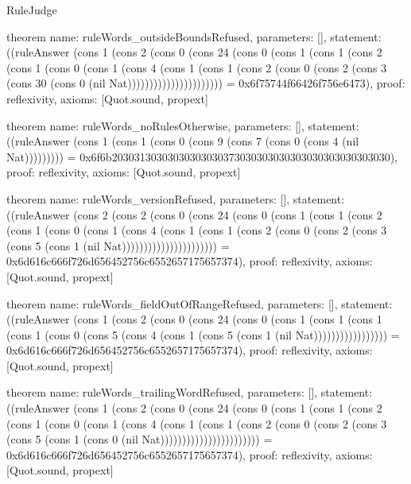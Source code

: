 \begin{lexlean}{RuleJudge}
\begin{semanticmodule}
theorem{
  name: ruleWords_outsideBoundsRefused,
  parameters: [],
  statement: ((ruleAnswer (cons 1 (cons 2 (cons 0 (cons 24 (cons 0 (cons 1 (cons 1 (cons 2 (cons 1 (cons 0 (cons 1 (cons 4 (cons 1 (cons 1 (cons 2 (cons 0 (cons 2 (cons 3 (cons 30 (cons 0 (nil Nat)))))))))))))))))))))) = 0x6f75744f66426f756e6473),
  proof: reflexivity{},
  axioms: [Quot.sound, propext]
}

theorem{
  name: ruleWords_noRulesOtherwise,
  parameters: [],
  statement: ((ruleAnswer (cons 1 (cons 1 (cons 0 (cons 9 (cons 7 (cons 0 (cons 4 (nil Nat))))))))) = 0x6f6b20303130303030303030373030303030303030303030303030),
  proof: reflexivity{},
  axioms: [Quot.sound, propext]
}

theorem{
  name: ruleWords_versionRefused,
  parameters: [],
  statement: ((ruleAnswer (cons 2 (cons 2 (cons 0 (cons 24 (cons 0 (cons 1 (cons 1 (cons 2 (cons 1 (cons 0 (cons 1 (cons 4 (cons 1 (cons 1 (cons 2 (cons 0 (cons 2 (cons 3 (cons 5 (cons 1 (nil Nat)))))))))))))))))))))) = 0x6d616c666f726d656452756c6552657175657374),
  proof: reflexivity{},
  axioms: [Quot.sound, propext]
}

theorem{
  name: ruleWords_fieldOutOfRangeRefused,
  parameters: [],
  statement: ((ruleAnswer (cons 1 (cons 2 (cons 0 (cons 24 (cons 0 (cons 1 (cons 1 (cons 1 (cons 1 (cons 0 (cons 5 (cons 4 (cons 1 (cons 5 (cons 1 (nil Nat))))))))))))))))) = 0x6d616c666f726d656452756c6552657175657374),
  proof: reflexivity{},
  axioms: [Quot.sound, propext]
}

theorem{
  name: ruleWords_trailingWordRefused,
  parameters: [],
  statement: ((ruleAnswer (cons 1 (cons 2 (cons 0 (cons 24 (cons 0 (cons 1 (cons 1 (cons 2 (cons 1 (cons 0 (cons 1 (cons 4 (cons 1 (cons 1 (cons 2 (cons 0 (cons 2 (cons 3 (cons 5 (cons 1 (cons 0 (nil Nat))))))))))))))))))))))) = 0x6d616c666f726d656452756c6552657175657374),
  proof: reflexivity{},
  axioms: [Quot.sound, propext]
}
\end{semanticmodule}
\end{lexlean}
